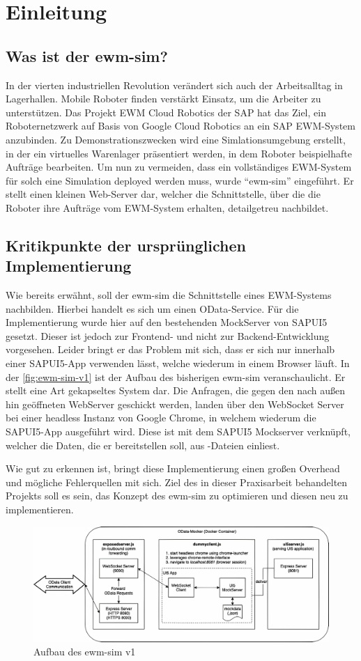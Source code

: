 \chapter{Einleitung}

\section{Was ist der ewm-sim?}
In der vierten industriellen Revolution verändert sich auch der Arbeitsalltag in Lagerhallen. Mobile Roboter finden verstärkt Einsatz, um die Arbeiter zu unterstützen. Das Projekt \ac{EWM} Cloud Robotics der SAP hat das Ziel, ein Roboternetzwerk auf Basis von Google Cloud Robotics an ein SAP \ac{EWM}-System anzubinden. Zu Demonstrationszwecken wird eine Simlationsumgebung erstellt, in der ein virtuelles Warenlager präsentiert werden, in dem Roboter beispielhafte Aufträge bearbeiten. Um nun zu vermeiden, dass ein vollständiges \ac{EWM}-System für solch eine Simulation deployed werden muss, wurde \enquote{ewm-sim} eingeführt. Er stellt einen kleinen Web-Server dar, welcher die Schnittstelle, über die die Roboter ihre Aufträge vom \ac{EWM}-System erhalten, detailgetreu nachbildet.

\section{Kritikpunkte der ursprünglichen Implementierung}
Wie bereits erwähnt, soll der ewm-sim die Schnittstelle eines \ac{EWM}-Systems nachbilden. Hierbei handelt es sich um einen OData-Service. Für die Implementierung wurde hier auf den bestehenden MockServer von SAPUI5 gesetzt. Dieser ist jedoch zur Frontend- und nicht zur Backend-Entwicklung vorgesehen. Leider bringt er das Problem mit sich, dass er sich nur innerhalb einer SAPUI5-App verwenden lässt, welche wiederum in einem Browser läuft. In der \autoref{fig:ewm-sim-v1} ist der Aufbau des bisherigen ewm-sim veranschaulicht. Er stellt eine Art gekapseltes System dar. Die Anfragen, die gegen den nach außen hin geöffneten WebServer geschickt werden, landen über den WebSocket Server bei einer headless Instanz von Google Chrome, in welchem wiederum die SAPUI5-App ausgeführt wird. Diese ist mit dem SAPUI5 Mockserver verknüpft, welcher die Daten, die er bereitstellen soll, aus -Dateien einliest.

Wie gut zu erkennen ist, bringt diese Implementierung einen großen Overhead und mögliche Fehlerquellen mit sich. Ziel des in dieser Praxisarbeit behandelten Projekts soll es sein, das Konzept des ewm-sim zu optimieren und diesen neu zu implementieren.

\begin{figure}
    \centering
    \includegraphics[width=\textwidth]{Bilder/ewm-sim_v1_4x.pdf}
    \caption{Aufbau des ewm-sim v1}
    \label{fig:ewm-sim-v1}
\end{figure}